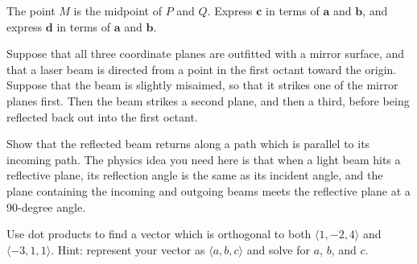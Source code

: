 \documentclass{watsonbook}
\begin{document}
\begin{aexercise}
  \begin{minipage}[t]{0.58\textwidth}
    The point $M$ is the midpoint of $P$ and $Q$. Express $\mathbf{c}$
    in terms of $\mathbf{a}$ and $\mathbf{b}$, and express $\mathbf{d}$
    in terms of $\mathbf{a}$ and $\mathbf{b}$.
  \end{minipage} \hspace{6mm}
  \begin{minipage}[t]{0.4\textwidth}
  \end{minipage}
\end{aexercise}

\begin{aexercise}
  Suppose that all three coordinate planes are outfitted with a mirror
  surface, and that a laser beam is directed from a point in the first
  octant toward the origin. Suppose that the beam is slightly
  misaimed, so that it strikes one of the mirror planes first. Then
  the beam strikes a second plane, and then a third, before being
  reflected back out into the first octant.

  Show that the reflected beam returns along a path which is parallel
  to its incoming path. The physics idea you need here is that when a
  light beam hits a reflective plane, its reflection angle is the same
  as its incident angle, and the plane containing the incoming and
  outgoing beams meets the reflective plane at a 90-degree angle.
\end{aexercise}


\begin{aexercise}
  Use dot products to find a vector which is orthogonal to both
  $\langle 1, -2, 4 \rangle$ and $\langle -3, 1, 1 \rangle$. Hint:
  represent your vector as $\langle a, b, c \rangle$ and solve for
  $a$, $b$, and $c$. 
\end{aexercise}
\end{document}
